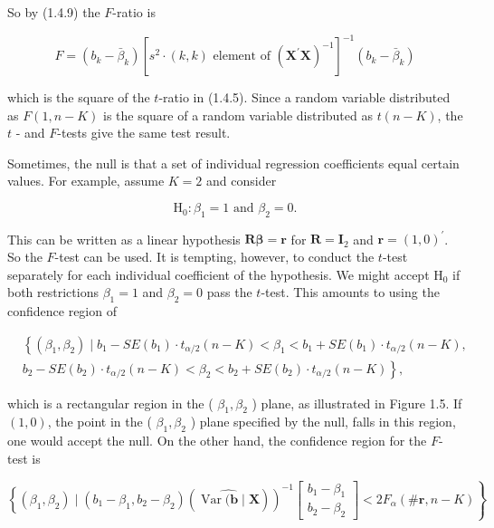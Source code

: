 \documentclass[10pt]{article}
\begin{document}
So by (1.4.9) the $F$-ratio is

$$
F=\left(b_{k}-\bar{\beta}_{k}\right)\left[s^{2} \cdot(k, k) \text { element of }\left(\mathbf{X}^{\prime} \mathbf{X}\right)^{-1}\right]^{-1}\left(b_{k}-\bar{\beta}_{k}\right)
$$

which is the square of the $t$-ratio in (1.4.5). Since a random variable distributed as $F(1, n-K)$ is the square of a random variable distributed as $t(n-K)$, the $t$ - and $F$-tests give the same test result.

Sometimes, the null is that a set of individual regression coefficients equal certain values. For example, assume $K=2$ and consider

$$
\mathrm{H}_{0}: \beta_{1}=1 \text { and } \beta_{2}=0 .
$$

This can be written as a linear hypothesis $\mathbf{R} \boldsymbol{\beta}=\mathbf{r}$ for $\mathbf{R}=\mathbf{I}_{2}$ and $\mathbf{r}=(1,0)^{\prime}$. So the $F$-test can be used. It is tempting, however, to conduct the $t$-test separately for each individual coefficient of the hypothesis. We might accept $\mathrm{H}_{0}$ if both restrictions $\beta_{1}=1$ and $\beta_{2}=0$ pass the $t$-test. This amounts to using the confidence region of

$$
\begin{aligned}
&\left\{\left(\beta_{1}, \beta_{2}\right) \mid\right. b_{1}-S E\left(b_{1}\right) \cdot t_{\alpha / 2}(n-K)<\beta_{1}<b_{1}+S E\left(b_{1}\right) \cdot t_{\alpha / 2}(n-K), \\
&\left.b_{2}-S E\left(b_{2}\right) \cdot t_{\alpha / 2}(n-K)<\beta_{2}<b_{2}+S E\left(b_{2}\right) \cdot t_{\alpha / 2}(n-K)\right\},
\end{aligned}
$$

which is a rectangular region in the ( $\beta_{1}, \beta_{2}$ ) plane, as illustrated in Figure 1.5. If $(1,0)$, the point in the ( $\beta_{1}, \beta_{2}$ ) plane specified by the null, falls in this region, one would accept the null. On the other hand, the confidence region for the $F$-test is

$$
\left.\left\{\left(\beta_{1}, \beta_{2}\right) \mid\left(b_{1}-\beta_{1}, b_{2}-\beta_{2}\right)(\widehat{\operatorname{Var}(\mathbf{b} \mid \mathbf{X}})\right)^{-1}\left[\begin{array}{l}
b_{1}-\beta_{1} \\
b_{2}-\beta_{2}
\end{array}\right]<2 F_{\alpha}(\# \mathbf{r}, n-K)\right\}
$$
\end{document}
